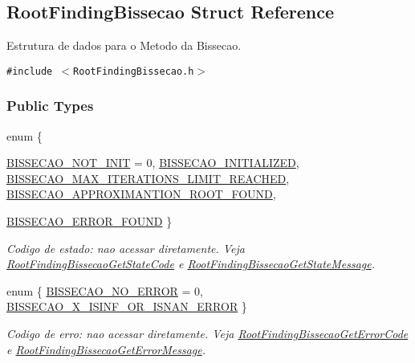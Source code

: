 \hypertarget{structRootFindingBissecao}{
\subsection{RootFindingBissecao Struct Reference}
\label{structRootFindingBissecao}
}
Estrutura de dados para o Metodo da Bissecao.  


{\tt \#include $<$RootFindingBissecao.h$>$}

\subsubsection*{Public Types}
\begin{CompactItemize}
\item 
enum \{ \par
\hyperlink{structRootFindingBissecao_4761213e1c4bcef4e874343a7b8d771aedb8bebcaa12b3fa68c61c6542dde16c}{BISSECAO\_\-NOT\_\-INIT} =  0, 
\hyperlink{structRootFindingBissecao_4761213e1c4bcef4e874343a7b8d771a35d026d6918775414ccaca5903d002d2}{BISSECAO\_\-INITIALIZED}, 
\hyperlink{structRootFindingBissecao_4761213e1c4bcef4e874343a7b8d771a00de73525857a692407d8b665a4084e8}{BISSECAO\_\-MAX\_\-ITERATIONS\_\-LIMIT\_\-REACHED}, 
\hyperlink{structRootFindingBissecao_4761213e1c4bcef4e874343a7b8d771a470d5787e5a15f2cd06b04df953a14ec}{BISSECAO\_\-APPROXIMANTION\_\-ROOT\_\-FOUND}, 
\par
\hyperlink{structRootFindingBissecao_4761213e1c4bcef4e874343a7b8d771aa5348a95f1e272a1a422d9ec87c62549}{BISSECAO\_\-ERROR\_\-FOUND}
 \}
\begin{CompactList}\small\item\em Codigo de estado: nao acessar diretamente. Veja \hyperlink{group____bissecao_g2ab4fb7daf5901001d011ee85dc4cfe0}{RootFindingBissecaoGetStateCode} e \hyperlink{group____bissecao_gb0455a1f4f30b2e8916d9dff5c237be1}{RootFindingBissecaoGetStateMessage}. \item\end{CompactList}\item 
enum \{ \hyperlink{structRootFindingBissecao_6a58c7139b830307aaf62ffa2e9175d99e3115571687e8ab7da7a5553becb6ec}{BISSECAO\_\-NO\_\-ERROR} =  0, 
\hyperlink{structRootFindingBissecao_6a58c7139b830307aaf62ffa2e9175d9d6103abe4afb484b65910b31e7f537c2}{BISSECAO\_\-X\_\-ISINF\_\-OR\_\-ISNAN\_\-ERROR}
 \}
\begin{CompactList}\small\item\em Codigo de erro: nao acessar diretamente. Veja \hyperlink{group____bissecao_g9672d1ca4387db1792f8219968118900}{RootFindingBissecaoGetErrorCode} e \hyperlink{group____bissecao_g77e94d3a9b5999461aabeca3bfe1837a}{RootFindingBissecaoGetErrorMessage}. \item\end{CompactList}\end{CompactItemize}
